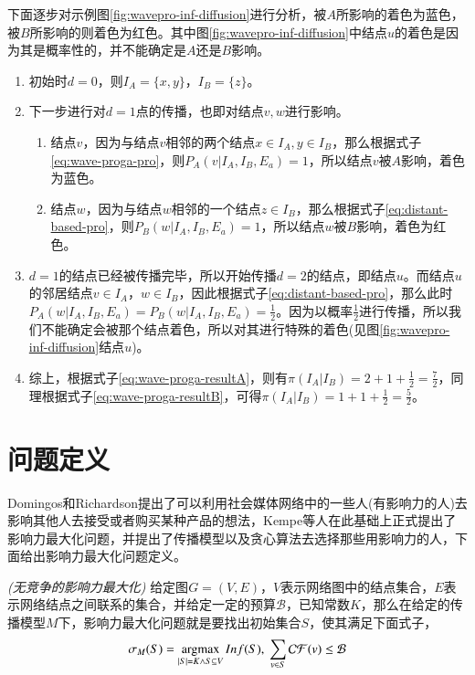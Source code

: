 下面逐步对示例图\ref{fig:wavepro-inf-diffusion}进行分析，被$A$所影响的着色为蓝色，被$B$所影响的则着色为红色。其中图\ref{fig:wavepro-inf-diffusion}中结点$u$的着色是因为其是概率性的，并不能确定是$A$还是$B$影响。
\begin{enumerate}
\item 初始时$d=0$，则$I_{A}=\{x, y\}$，$I_{B}=\{z\}$。
\item 下一步进行对$d=1$点的传播，也即对结点$v, w$进行影响。
\begin{enumerate}
\item 结点$v$，因为与结点$v$相邻的两个结点$x \in I_{A}, y \in I_{B}$，那么根据式子\ref{eq:wave-proga-pro}，则$P_{A}(v|I_{A}, I_{B}, E_{a})=1$，所以结点$v$被$A$影响，着色为蓝色。
\item 结点$w$，因为与结点$w$相邻的一个结点$z \in I_{B}$，那么根据式子\ref{eq:distant-based-pro}，则$P_{B}(w|I_{A}, I_{B}, E_{a})=1$，所以结点$w$被$B$影响，着色为红色。
\end{enumerate}
\item $d=1$的结点已经被传播完毕，所以开始传播$d=2$的结点，即结点$u$。而结点$u$的邻居结点$v \in I_{A}$，$w \in I_{B}$，因此根据式子\ref{eq:distant-based-pro}，那么此时$P_{A}(w|I_{A}, I_{B}, E_{a})=P_{B}(w|I_{A}, I_{B}, E_{a})=\frac{1}{2}$。因为以概率$\frac{1}{2}$进行传播，所以我们不能确定会被那个结点着色，所以对其进行特殊的着色(见图\ref{fig:wavepro-inf-diffusion}结点$u$)。
\item 综上，根据式子\ref{eq:wave-proga-resultA}，则有$\pi(I_{A}|I_{B})=2+1+\frac{1}{2}=\frac{7}{2}$，同理根据式子\ref{eq:wave-proga-resultB}，可得$\pi(I_{A}|I_{B})=1+1+\frac{1}{2}=\frac{5}{2}$。
\end{enumerate}



\section{问题定义}
Domingos和Richardson\cite{domingos2001mining}提出了可以利用社会媒体网络中的一些人(有影响力的人)去影响其他人去接受或者购买某种产品的想法，Kempe\cite{kempe2003maximizing}等人在此基础上正式提出了影响力最大化问题，并提出了传播模型以及贪心算法去选择那些用影响力的人，下面给出影响力最大化问题定义。

\begin{definition}
\emph{(无竞争的影响力最大化)}
\label{def:noncompetitive-infmax}
给定图$G=(V, E)$，$V$表示网络图中的结点集合，$E$表示网络结点之间联系的集合，并给定一定的预算$\mathcal{B}$，已知常数$K$，那么在给定的传播模型$M$下，影响力最大化问题就是要找出初始集合$S$，使其满足下面式子，
\begin{displaymath}
\sigma_{M}(S) = \mathop{\rm argmax} \limits_{|S|=K \wedge S \subseteq V} Inf(S), ~ \sum_{v \in S} \mathcal{CF}(v) \leq \mathcal{B}
\end{displaymath}
\end{definition}


